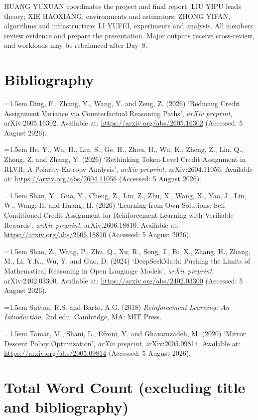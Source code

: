 \documentclass[11pt,a4paper]{article}
\begin{document}
HUANG YUXUAN coordinates the project and final report. LIU YIPU leads theory; XIE HAOXIANG, environments and estimators; ZHONG YIFAN, algorithms and infrastructure; LI YUFEI, experiments and analysis. All members review evidence and prepare the presentation. Major outputs receive cross-review, and workloads may be rebalanced after Day~8.

\section*{Bibliography}

\hangindent=1.5em
Ding, F., Zhang, Y., Wang, Y. and Zeng, Z. (2026) `Reducing Credit Assignment Variance via Counterfactual Reasoning Paths', \textit{arXiv preprint}, arXiv:2605.16302. Available at: \url{https://arxiv.org/abs/2605.16302} (Accessed: 5 August 2026).

\hangindent=1.5em
He, Y., Wu, H., Liu, S., Ge, H., Zhou, H., Wu, K., Zheng, Z., Lin, Q., Zhong, Z. and Zhang, Y. (2026) `Rethinking Token-Level Credit Assignment in RLVR: A Polarity-Entropy Analysis', \textit{arXiv preprint}, arXiv:2604.11056. Available at: \url{https://arxiv.org/abs/2604.11056} (Accessed: 5 August 2026).

\hangindent=1.5em
Shan, Y., Guo, Y., Cheng, Z., Liu, Z., Zhu, X., Wang, X., Yao, J., Lin, W., Wang, H. and Huang, H. (2026) `Learning from Own Solutions: Self-Conditioned Credit Assignment for Reinforcement Learning with Verifiable Rewards', \textit{arXiv preprint}, arXiv:2606.18810. Available at: \url{https://arxiv.org/abs/2606.18810} (Accessed: 5 August 2026).

\hangindent=1.5em
Shao, Z., Wang, P., Zhu, Q., Xu, R., Song, J., Bi, X., Zhang, H., Zhang, M., Li, Y.K., Wu, Y. and Guo, D. (2024) `DeepSeekMath: Pushing the Limits of Mathematical Reasoning in Open Language Models', \textit{arXiv preprint}, arXiv:2402.03300. Available at: \url{https://arxiv.org/abs/2402.03300} (Accessed: 5 August 2026).

\hangindent=1.5em
Sutton, R.S. and Barto, A.G. (2018) \textit{Reinforcement Learning: An Introduction}. 2nd edn. Cambridge, MA: MIT Press.

\hangindent=1.5em
Tomar, M., Shani, L., Efroni, Y. and Ghavamzadeh, M. (2020) `Mirror Descent Policy Optimization', \textit{arXiv preprint}, arXiv:2005.09814. Available at: \url{https://arxiv.org/abs/2005.09814} (Accessed: 5 August 2026).

\section*{Total Word Count (excluding title and bibliography)}
\end{document}
